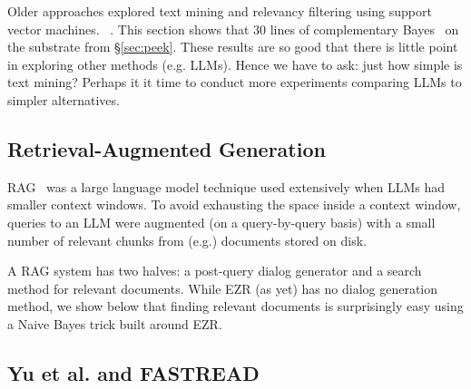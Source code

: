 \documentclass[AMA,STIX2COL]{WileyNJDv5}
\begin{document}
Older
approaches explored text mining and relevancy filtering using
support vector machines. ~\cite{yu2018total,yu2018finding}. This section shows
that 30 lines of complementary Bayes~\cite{rennie2003tackling}
on the substrate from \S\ref{sec:peek}. These results
are so good  that there is little point
in exploring other methods (e.g. LLMs). Hence we have to ask:
just how simple is text mining? Perhaps it it time
to conduct more experiments
comparing LLMs to simpler alternatives.



 \subsection{Retrieval-Augmented Generation} 
 RAG~\cite{lewis2020rag} was a large language model
 technique used extensively when LLMs
 had smaller context
 windows. To avoid exhausting the space
 inside a context window,
   queries to an LLM were 
augmented (on a query-by-query basis)
with a small number of relevant chunks
from (e.g.)  documents stored on disk. 

A RAG system has two halves: a post-query dialog generator and a
 search method for relevant documents. While EZR (as yet)
has no dialog generation method, we show below
that finding relevant documents is surprisingly easy using
a Naive Bayes trick built
around EZR.

\subsection{Yu et al. and FASTREAD}
\end{document}
